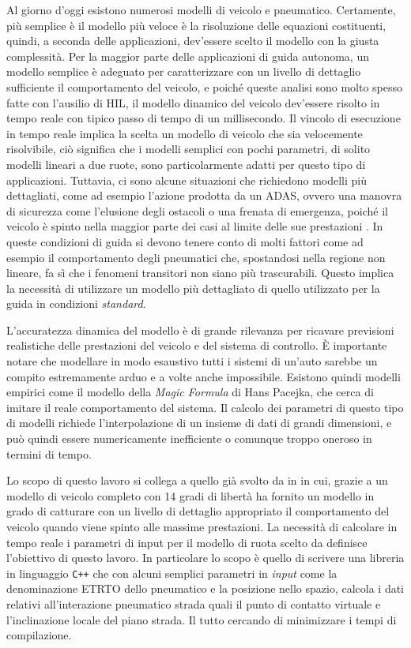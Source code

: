 Al giorno d'oggi esistono numerosi modelli di veicolo e pneumatico. Certamente, più semplice è il modello più veloce è la risoluzione delle equazioni costituenti, quindi, a seconda delle applicazioni, dev'essere scelto il modello con la giusta complessità. Per la maggior parte delle applicazioni di guida autonoma, un modello semplice è adeguato per caratterizzare con un livello di dettaglio sufficiente il comportamento del veicolo, e poiché queste analisi sono molto spesso fatte con l'ausilio di \ac{HIL}, il modello dinamico del veicolo dev'essere risolto in tempo reale con tipico passo di tempo di un millisecondo. Il vincolo di esecuzione in tempo reale implica la scelta un modello di veicolo che sia velocemente risolvibile, ciò significa che i modelli semplici con pochi parametri, di solito modelli lineari a due ruote, sono particolarmente adatti per questo tipo di applicazioni. Tuttavia, ci sono alcune situazioni che richiedono modelli più dettagliati, come ad esempio l'azione prodotta da un \ac{ADAS}, ovvero una manovra di sicurezza come l'elusione degli ostacoli o una frenata di emergenza, poiché il veicolo è spinto nella maggior parte dei casi al limite delle sue prestazioni \cite{impacts}. In queste condizioni di guida si devono tenere conto di molti fattori come ad esempio il comportamento degli pneumatici che, spostandosi nella regione non lineare, fa sì che i fenomeni transitori non siano più trascurabili. Questo implica la necessità di utilizzare un modello più dettagliato di quello utilizzato per la guida in condizioni \textit{standard}.

L'accuratezza dinamica del modello è di grande rilevanza per ricavare previsioni realistiche delle prestazioni del veicolo e del sistema di controllo. È importante notare che modellare in modo esaustivo tutti i sistemi di un'auto sarebbe un compito estremamente arduo e a volte anche impossibile. Esistono quindi modelli empirici come il modello della \textit{Magic Formula} di Hans Pacejka, che cerca di imitare il reale comportamento del sistema. Il calcolo dei parametri di questo tipo di modelli richiede l'interpolazione di un insieme di dati di grandi dimensioni, e può quindi essere numericamente inefficiente o comunque troppo oneroso in termini di tempo.

Lo scopo di questo lavoro si collega a quello già svolto da \citeauthor{Larcher} in \cite{Larcher} in cui, grazie a un modello di veicolo completo con 14 gradi di libertà ha fornito un modello in grado di catturare con un livello di dettaglio appropriato il comportamento del veicolo quando viene spinto alle massime prestazioni. La necessità di calcolare in tempo reale i parametri di input per il modello di ruota scelto da \cite{Larcher} definisce l'obiettivo di questo lavoro. In particolare lo scopo è quello di scrivere una libreria in linguaggio \texttt{C++} che con alcuni semplici parametri in \textit{input} come la denominazione \ac{ETRTO} dello pneumatico e la posizione nello spazio, calcola i dati relativi all'interazione pneumatico strada quali il punto di contatto virtuale e l'inclinazione locale del piano strada. Il tutto cercando di minimizzare i tempi di compilazione.
